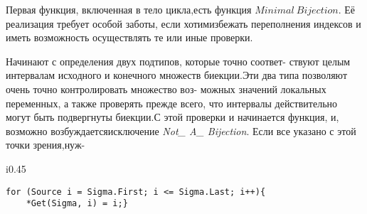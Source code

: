 Первая функция, включенная в тело цикла,есть функция\linebreak
${Minimal~Bijection}$. Её реализация требует особой заботы, если хотим\linebreak избежать переполнения индексов и иметь возможность осуществлять\linebreak 
те или иные проверки.

Начинают с определения двух подтипов, которые точно соответ- \linebreak ствуют целым интервалам исходного и конечного множеств биекции.\linebreak Эти два типа позволяют очень точно контролировать множество воз- \linebreak можных значений локальных переменных, а также проверять прежде \linebreak всего, что интервалы действительно могут быть подвергнуты биекции.\linebreak С этой проверки и начинается функция, и, возможно возбуждается\linebreak исключение \textit{Not\_ A\_ Bijection}. Если все указано с этой точки зрения,нуж-

\begin{wrapfigure}{i}{0.45\textwidth}
\vspace{-10pt}
\begin{lstlisting}
for (Source i = Sigma.First; i <= Sigma.Last; i++){
    *Get(Sigma, i) = i;}
\end{lstlisting}
\vspace{-15pt}
\end{wrapfigure}

